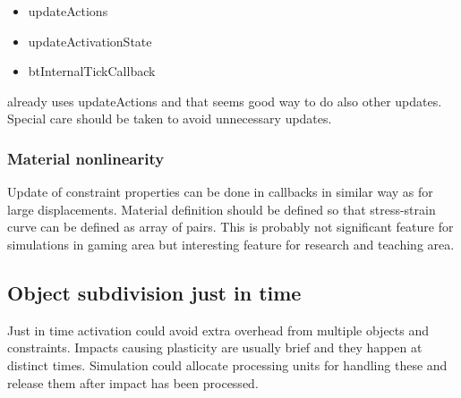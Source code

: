 \begin{itemize}
\item updateActions
\item updateActivationState
\item btInternalTickCallback
\end{itemize}

\demolisher already uses updateActions and that seems 
good way to do also other updates. Special care should be taken to avoid unnecessary updates.

\subsubsection{Material nonlinearity}
Update of constraint properties can be done in callbacks in similar way as for large displacements.
Material definition should be defined so that stress-strain curve can be defined as array of pairs.
This is probably not significant feature for simulations in gaming area but interesting feature for research and teaching area.

\subsection{Object subdivision just in time}
Just in time activation could avoid extra overhead from multiple objects and constraints.
Impacts causing plasticity are usually brief and they happen at distinct times. 
Simulation could allocate processing units for handling these and release them after impact has been processed.

\cleardoublepage
